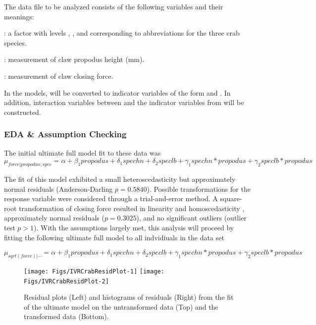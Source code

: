 \documentclass[10pt,openany]{book}\usepackage[]{graphicx}\usepackage[]{color}
\newenvironment{knitrout}{}{} %
\begin{document}
The data file to be analyzed consists of the following variables and their meanings:
\begin{Itemize}
  \item {}: a factor with levels , , and  corresponding to abbreviations for the three crab species.
  \item {}: measurement of claw propodus height (mm).
  \item {}: measurement of claw closing force.
\end{Itemize}
In the models,  will be converted to indicator variables of the form  and .  In addition, interaction variables between  and the indicator variables from  will be constructed.

\subsubsection*{EDA \& Assumption Checking}

The initial ultimate full model fit to these data was
\[ \mu_{force|propodus,spec} = \alpha + \beta_{1}propodus  + \delta_{1}spechn + \delta_{2}speclb + \gamma_{1}spechn*propodus + \gamma_{2}speclb*propodus \]

The fit of this model exhibited a small heteroscedasticity  but approximately normal residuals (Anderson-Darling $p=0.5840$).  Possible transformations for the response variable were considered through a trial-and-error method.  A square-root transformation of closing force resulted in linearity and homoscedasticity , approximately normal residuals ($p=0.3025$), and no significant outliers (outlier test $p>1$).  With the assumptions largely met, this analysis will proceed by fitting the following ultimate full model to all indvidiuals in the data set

\[ \mu_{sqrt(force)|\cdots} = \alpha + \beta_{1}propodus + \delta_{1}spechn + \delta_{2}speclb + \gamma_{1}spechn*propodus + \gamma_{2}speclb*propodus \]

\begin{knitrout}
\color{fgcolor}\begin{figure}[h]

{\centering \texttt{[image: Figs/IVRCrabResidPlot-1]} 
\texttt{[image: Figs/IVRCrabResidPlot-2]} 

}

\caption[Residual plots (Left) and histograms of residuals (Right) from the fit of the ultimate model on the untransformed data (Top) and the transformed data (Bottom)]{Residual plots (Left) and histograms of residuals (Right) from the fit of the ultimate model on the untransformed data (Top) and the transformed data (Bottom).}\label{fig:IVRCrabResidPlot}
\end{figure}


\end{knitrout}
\end{document}
